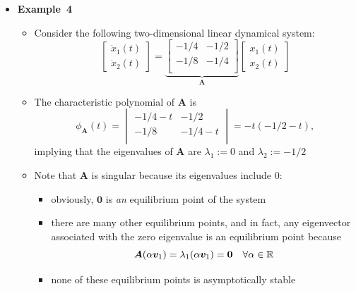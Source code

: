 \documentclass[12pt,a4paper]{article}
\begin{document}
\begin{itemize}
\clearpage
\item \textbf{Example~4}
  \begin{itemize}
  \item Consider the following two-dimensional linear dynamical system:
    \begin{equation}\nonumber%
      \begin{bmatrix}
        \dot{x}_{1}(t) \\
        \dot{x}_{2}(t)
      \end{bmatrix}
      =
      \underbrace{
      \begin{bmatrix}
        -1/4 & -1/2 \\
        -1/8 & -1/4 \\
      \end{bmatrix}}_{\bm{A}}
      \begin{bmatrix}
        x_{1}(t) \\
        x_{2}(t)
      \end{bmatrix}
    \end{equation}
  \item The characteristic polynomial of $\bm{A}$ is
    \begin{equation}\nonumber%
      \phi_{\bm{A}}(t) = 
      \begin{vmatrix}
        -1/4 - t & -1/2 \\
        -1/8 & -1/4 - t \\
      \end{vmatrix}
      = -t(-1/2-t),
    \end{equation}
    implying that
    the eigenvalues of $\bm{A}$ are $\lambda_{1}:=0$ and $\lambda_{2}:=-1/2$

  \item Note that $\bm{A}$ is singular
    because its eigenvalues include $0$:
    \begin{itemize}
    \item obviously, $\bm{0}$ is \emph{an} equilibrium point of the system
    \item there are many other equilibrium points, and in fact,
      any eigenvector associated with the zero eigenvalue is an equilibrium point because
      \begin{equation}\nonumber%
        \bm{A}(\alpha\bm{v}_{1}) = \lambda_{1}(\alpha\bm{v}_{1}) = \bm{0}
        \quad \forall \alpha\in \R
      \end{equation}
    \item none of these equilibrium points is asymptotically stable
    \end{itemize}
    

\end{itemize}
\end{itemize}
\end{document}
